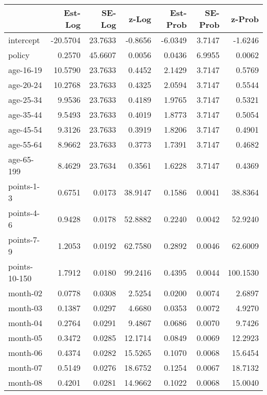 \documentclass[10pt]{article}
\begin{document}

\begin{table}[ht]
\centering
\begin{tabular}{lrrrrrr}
  \hline
 & Est-Log & SE-Log & z-Log & Est-Prob & SE-Prob & z-Prob \\ 
  \hline
intercept & -20.5704 & 23.7633 & -0.8656 & -6.0349 & 3.7147 & -1.6246 \\ 
  policy & 0.2570 & 45.6607 & 0.0056 & 0.0436 & 6.9955 & 0.0062 \\ 
  age-16-19 & 10.5790 & 23.7633 & 0.4452 & 2.1429 & 3.7147 & 0.5769 \\ 
  age-20-24 & 10.2768 & 23.7633 & 0.4325 & 2.0594 & 3.7147 & 0.5544 \\ 
  age-25-34 & 9.9536 & 23.7633 & 0.4189 & 1.9765 & 3.7147 & 0.5321 \\ 
  age-35-44 & 9.5493 & 23.7633 & 0.4019 & 1.8773 & 3.7147 & 0.5054 \\ 
  age-45-54 & 9.3126 & 23.7633 & 0.3919 & 1.8206 & 3.7147 & 0.4901 \\ 
  age-55-64 & 8.9662 & 23.7633 & 0.3773 & 1.7391 & 3.7147 & 0.4682 \\ 
  age-65-199 & 8.4629 & 23.7634 & 0.3561 & 1.6228 & 3.7147 & 0.4369 \\ 
  points-1-3 & 0.6751 & 0.0173 & 38.9147 & 0.1586 & 0.0041 & 38.8364 \\ 
  points-4-6 & 0.9428 & 0.0178 & 52.8882 & 0.2240 & 0.0042 & 52.9240 \\ 
  points-7-9 & 1.2053 & 0.0192 & 62.7580 & 0.2892 & 0.0046 & 62.6009 \\ 
  points-10-150 & 1.7912 & 0.0180 & 99.2416 & 0.4395 & 0.0044 & 100.1530 \\ 
  month-02 & 0.0778 & 0.0308 & 2.5254 & 0.0200 & 0.0074 & 2.6897 \\ 
  month-03 & 0.1387 & 0.0297 & 4.6680 & 0.0353 & 0.0072 & 4.9270 \\ 
  month-04 & 0.2764 & 0.0291 & 9.4867 & 0.0686 & 0.0070 & 9.7426 \\ 
  month-05 & 0.3472 & 0.0285 & 12.1714 & 0.0849 & 0.0069 & 12.2923 \\ 
  month-06 & 0.4374 & 0.0282 & 15.5265 & 0.1070 & 0.0068 & 15.6454 \\ 
  month-07 & 0.5149 & 0.0276 & 18.6752 & 0.1254 & 0.0067 & 18.7132 \\ 
  month-08 & 0.4201 & 0.0281 & 14.9662 & 0.1022 & 0.0068 & 15.0040 \\ 

\end{tabular}
\end{table}
\end{document}
